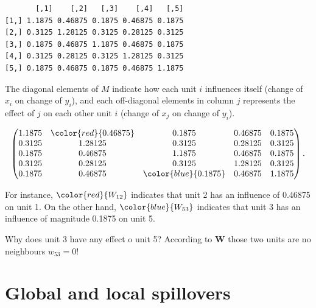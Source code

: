 \documentclass[
  letterpaper,
]{scrbook}
\begin{document}
\begin{verbatim}
       [,1]    [,2]   [,3]    [,4]   [,5]
[1,] 1.1875 0.46875 0.1875 0.46875 0.1875
[2,] 0.3125 1.28125 0.3125 0.28125 0.3125
[3,] 0.1875 0.46875 1.1875 0.46875 0.1875
[4,] 0.3125 0.28125 0.3125 1.28125 0.3125
[5,] 0.1875 0.46875 0.1875 0.46875 1.1875
\end{verbatim}

The diagonal elements of \(M\) indicate how each unit \(i\) influences
itself (change of \(x_i\) on change of \(y_i\)), and each off-diagonal
elements in column \(j\) represents the effect of \(j\) on each other
unit \(i\) (change of \(x_j\) on change of \(y_i\)).

\[
\begin{split}
\begin{pmatrix}
      1.1875 & \color{red}{0.46875} & 0.1875 & 0.46875 & 0.1875 \\
      0.3125 & 1.28125 & 0.3125 & 0.28125 & 0.3125 \\
      0.1875 & 0.46875 & 1.1875 & 0.46875 & 0.1875 \\
      0.3125 & 0.28125 & 0.3125 & 1.28125 & 0.3125 \\
      0.1875 & 0.46875 & \color{blue}{0.1875} & 0.46875 & 1.1875
      \end{pmatrix}.
\end{split}
\]

For instance, \(\color{red}{W_{12}}\) indicates that unit 2 has an
influence of 0.46875 on unit 1. On the other hand,
\(\color{blue}{W_{53}}\) indicates that unit 3 has an influence of
magnitude 0.1875 on unit 5.

\begin{tcolorbox}[enhanced jigsaw, colframe=quarto-callout-tip-color-frame, coltitle=black, titlerule=0mm, opacitybacktitle=0.6, toprule=.15mm, colbacktitle=quarto-callout-tip-color!10!white, toptitle=1mm, leftrule=.75mm, colback=white, bottomtitle=1mm, opacityback=0, left=2mm, title=\textcolor{quarto-callout-tip-color}{\faLightbulb}\hspace{0.5em}{Question}, breakable, arc=.35mm, rightrule=.15mm, bottomrule=.15mm]

Why does unit 3 have any effect o unit 5? According to
\(\boldsymbol{\mathbf{W}}\) those two units are no neighbours
\(w_{53} = 0\)!

\end{tcolorbox}

\hypertarget{global-and-local-spillovers}{%
\section{Global and local
spillovers}\label{global-and-local-spillovers}}
\end{document}
